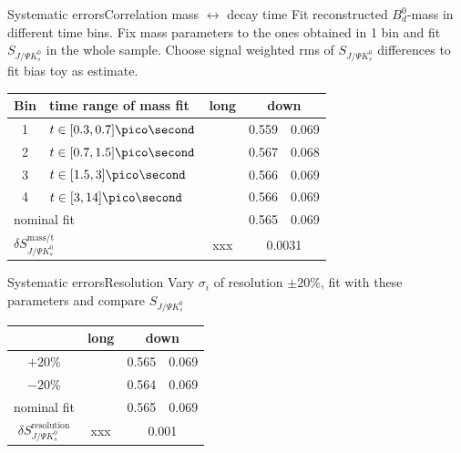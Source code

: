 \documentclass{beamer}
\newcommand{\Bd}{$B_d^0$}
\newcommand{\SJPsi}{S_{J/\Psi K_s^0}}
\begin{document}
\begin{frame}{Systematic errors}{Correlation mass $\leftrightarrow$ decay time}
Fit reconstructed \Bd-mass in different time bins. Fix mass parameters to the ones obtained in 1 bin and fit $\SJPsi$ in the whole sample. Choose signal weighted rms of $\SJPsi$ differences to fit bias toy as estimate.
\begin{center}
\begin{tabular}{c l r@{$\pm$}l r@{$\pm$}l}
\hline \hline
Bin & time range of mass fit & \multicolumn{2}{c}{long} & \multicolumn{2}{c}{down} \\ \hline
1 & $t \in [0.3, 0.7] \pico\second$ & & & 0.559 & 0.069 \\
2 & $t \in [0.7, 1.5] \pico\second$ & & & 0.567 & 0.068 \\
3 & $t \in [1.5, 3] \pico\second$ & & & 0.566 & 0.069 \\
4 & $t \in [3, 14] \pico\second$ & & & 0.566 & 0.069 \\ \hline
\multicolumn{2}{l}{nominal fit}  & & & 0.565 & 0.069 \\ \hline
\multicolumn{2}{l}{$\delta\SJPsi^{\text{mass/t}}$} & \multicolumn{2}{c}{xxx} & \multicolumn{2}{c}{0.0031} \\

\hline \hline
\end{tabular}
\end{center}
\end{frame}

\begin{frame}{Systematic errors}{Resolution}
Vary $\sigma_i$ of resolution $\pm 20\%$, fit with these parameters and compare $\SJPsi$
\begin{center}
\begin{tabular}{c r@{$\pm$}l r@{$\pm$}l}
\hline \hline
 & \multicolumn{2}{c}{long} & \multicolumn{2}{c}{down} \\ \hline
$+20\%$ & & & 0.565 & 0.069 \\
$-20\%$ & & & 0.564 & 0.069 \\ \hline
nominal fit & & & 0.565 & 0.069 \\ \hline
$\delta\SJPsi^{\text{resolution}}$ & \multicolumn{2}{c}{xxx} & \multicolumn{2}{c}{0.001} \\
\hline \hline
\end{tabular}
\end{center}
\end{frame}
\end{document}
